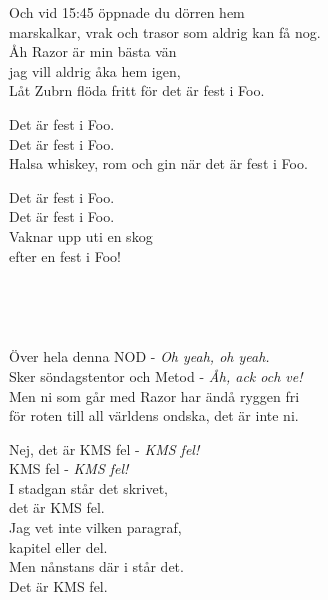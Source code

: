 Och vid 15:45 öppnade du dörren hem \\ 
marskalkar, vrak och trasor som aldrig kan få nog. \\
Åh Razor är min bästa vän  \\ 
jag vill aldrig åka hem igen, \\
Låt Zubrn flöda fritt för det är fest i Foo.

\leftrepeat  Det är fest i Foo.  \\ 
Det är fest i Foo. \\ 
Halsa whiskey, rom och gin när det är fest i Foo. \rightrepeat 

Det är fest i Foo. \\ 
Det är fest i Foo. \\ 
Vaknar upp uti en skog \\ 
efter en fest i Foo! 

 \\

\newpage


 \\       
\author{Text: Frodo}

\songtext{}Över hela denna NOD - \textit{Oh yeah, oh yeah.}\\
Sker söndagstentor och Metod - \textit{Åh, ack och ve!} \\
Men ni som går med Razor har ändå ryggen fri \\
för roten till all världens ondska, det är inte ni.

Nej, det är KMS fel - \textit{KMS fel!} \\
KMS fel - \textit{KMS fel!} \\
I stadgan står det skrivet, \\
det är KMS fel. \\
Jag vet inte vilken paragraf, \\
kapitel eller del. \\
Men nånstans där i står det. \\
Det är KMS fel.

